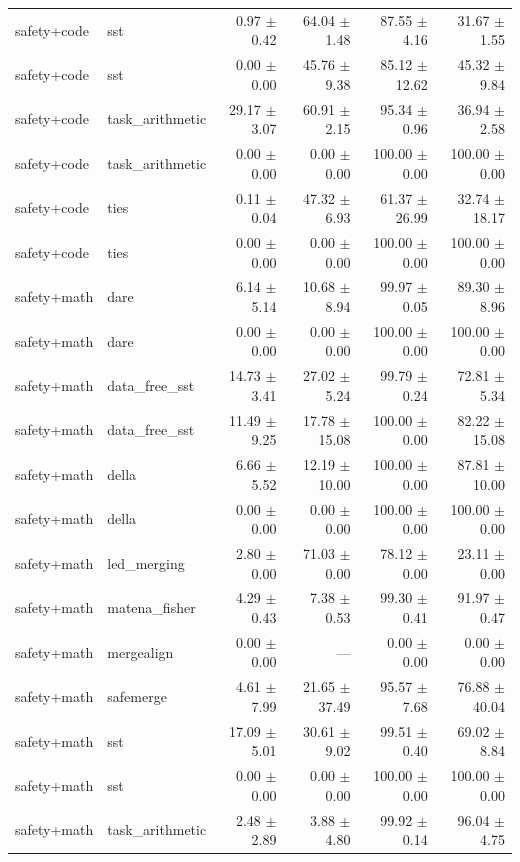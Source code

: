 \begin{table}[H]
{\begin{tabular}{llrrrr}
safety+code & sst & 0.97 $\pm$ 0.42 & 64.04 $\pm$ 1.48 & 87.55 $\pm$ 4.16 & 31.67 $\pm$ 1.55 \\
safety+code & sst & 0.00 $\pm$ 0.00 & 45.76 $\pm$ 9.38 & 85.12 $\pm$ 12.62 & 45.32 $\pm$ 9.84 \\
safety+code & task\_arithmetic & 29.17 $\pm$ 3.07 & 60.91 $\pm$ 2.15 & 95.34 $\pm$ 0.96 & 36.94 $\pm$ 2.58 \\
safety+code & task\_arithmetic & 0.00 $\pm$ 0.00 & 0.00 $\pm$ 0.00 & 100.00 $\pm$ 0.00 & 100.00 $\pm$ 0.00 \\
safety+code & ties & 0.11 $\pm$ 0.04 & 47.32 $\pm$ 6.93 & 61.37 $\pm$ 26.99 & 32.74 $\pm$ 18.17 \\
safety+code & ties & 0.00 $\pm$ 0.00 & 0.00 $\pm$ 0.00 & 100.00 $\pm$ 0.00 & 100.00 $\pm$ 0.00 \\
safety+math & dare & 6.14 $\pm$ 5.14 & 10.68 $\pm$ 8.94 & 99.97 $\pm$ 0.05 & 89.30 $\pm$ 8.96 \\
safety+math & dare & 0.00 $\pm$ 0.00 & 0.00 $\pm$ 0.00 & 100.00 $\pm$ 0.00 & 100.00 $\pm$ 0.00 \\
safety+math & data\_free\_sst & 14.73 $\pm$ 3.41 & 27.02 $\pm$ 5.24 & 99.79 $\pm$ 0.24 & 72.81 $\pm$ 5.34 \\
safety+math & data\_free\_sst & 11.49 $\pm$ 9.25 & 17.78 $\pm$ 15.08 & 100.00 $\pm$ 0.00 & 82.22 $\pm$ 15.08 \\
safety+math & della & 6.66 $\pm$ 5.52 & 12.19 $\pm$ 10.00 & 100.00 $\pm$ 0.00 & 87.81 $\pm$ 10.00 \\
safety+math & della & 0.00 $\pm$ 0.00 & 0.00 $\pm$ 0.00 & 100.00 $\pm$ 0.00 & 100.00 $\pm$ 0.00 \\
safety+math & led\_merging & 2.80 $\pm$ 0.00 & 71.03 $\pm$ 0.00 & 78.12 $\pm$ 0.00 & 23.11 $\pm$ 0.00 \\
safety+math & matena\_fisher & 4.29 $\pm$ 0.43 & 7.38 $\pm$ 0.53 & 99.30 $\pm$ 0.41 & 91.97 $\pm$ 0.47 \\
safety+math & mergealign & 0.00 $\pm$ 0.00 & --- & 0.00 $\pm$ 0.00 & 0.00 $\pm$ 0.00 \\
safety+math & safemerge & 4.61 $\pm$ 7.99 & 21.65 $\pm$ 37.49 & 95.57 $\pm$ 7.68 & 76.88 $\pm$ 40.04 \\
safety+math & sst & 17.09 $\pm$ 5.01 & 30.61 $\pm$ 9.02 & 99.51 $\pm$ 0.40 & 69.02 $\pm$ 8.84 \\
safety+math & sst & 0.00 $\pm$ 0.00 & 0.00 $\pm$ 0.00 & 100.00 $\pm$ 0.00 & 100.00 $\pm$ 0.00 \\
safety+math & task\_arithmetic & 2.48 $\pm$ 2.89 & 3.88 $\pm$ 4.80 & 99.92 $\pm$ 0.14 & 96.04 $\pm$ 4.75 \\

\end{tabular}}
\end{table}
